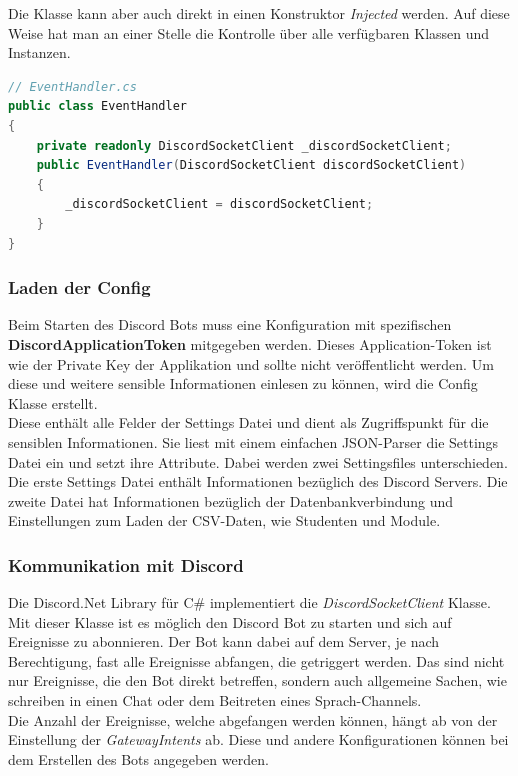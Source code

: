 \documentclass[a4paper, table]{article}
\begin{document}
Die Klasse kann aber auch direkt in einen Konstruktor \textit{Injected} werden.
Auf diese Weise hat man an einer Stelle die Kontrolle über alle verfügbaren Klassen und Instanzen.
\begin{lstlisting}[language=csharp]
// EventHandler.cs
public class EventHandler
{
    private readonly DiscordSocketClient _discordSocketClient;
    public EventHandler(DiscordSocketClient discordSocketClient)
    {
        _discordSocketClient = discordSocketClient;
    }
}
\end{lstlisting}

\subsubsection*{Laden der Config}
Beim Starten des Discord Bots muss eine Konfiguration mit spezifischen \textbf{DiscordApplicationToken} mitgegeben werden.
Dieses Application-Token ist wie der Private Key der Applikation und sollte nicht veröffentlicht werden.
Um diese und weitere sensible Informationen einlesen zu können, wird die Config Klasse erstellt.\\
Diese enthält alle Felder der Settings Datei und dient als Zugriffspunkt für die sensiblen Informationen.
Sie liest mit einem einfachen JSON-Parser die Settings Datei ein und setzt ihre Attribute.
Dabei werden zwei Settingsfiles unterschieden.
Die erste Settings Datei enthält Informationen bezüglich des Discord Servers.
Die zweite Datei hat Informationen bezüglich der Datenbankverbindung und Einstellungen zum Laden der CSV-Daten, wie Studenten und Module.

\subsubsection{Kommunikation mit Discord}
Die Discord.Net Library für C\# implementiert die \textit{DiscordSocketClient} Klasse.
Mit dieser Klasse ist es möglich den Discord Bot zu starten und sich auf Ereignisse zu abonnieren.
Der Bot kann dabei auf dem Server, je nach Berechtigung, fast alle Ereignisse abfangen, die getriggert werden.
Das sind nicht nur Ereignisse, die den Bot direkt betreffen, sondern auch allgemeine Sachen, 
wie schreiben in einen Chat oder dem Beitreten eines Sprach-Channels.\\
Die Anzahl der Ereignisse, welche abgefangen werden können, hängt ab von der Einstellung der \textit{GatewayIntents} ab.
Diese und andere Konfigurationen können bei dem Erstellen des Bots angegeben werden.
\end{document}
